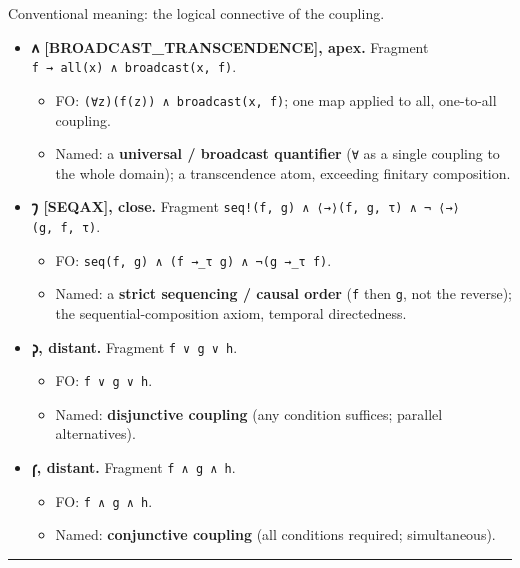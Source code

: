 Conventional meaning: the logical connective of the coupling.

\begin{itemize}
\tightlist
\item
  \textbf{𐑵 {[}BROADCAST\_TRANSCENDENCE{]}, apex.} Fragment
  \texttt{f\ →\ all(x)\ ∧\ broadcast(x,\ f)}.

  \begin{itemize}
  \tightlist
  \item
    FO: \texttt{(∀z)(f(z))\ ∧\ broadcast(x,\ f)}; one map applied to
    all, one-to-all coupling.
  \item
    Named: a \textbf{universal / broadcast quantifier} (\texttt{∀} as a
    single coupling to the whole domain); a transcendence atom,
    exceeding finitary composition.
  \end{itemize}
\item
  \textbf{𐑠 {[}SEQAX{]}, close.} Fragment
  \texttt{seq!(f,\ g)\ ∧\ ⟨→⟩(f,\ g,\ τ)\ ∧\ ¬\ ⟨→⟩(g,\ f,\ τ)}.

  \begin{itemize}
  \tightlist
  \item
    FO: \texttt{seq(f,\ g)\ ∧\ (f\ →\_τ\ g)\ ∧\ ¬(g\ →\_τ\ f)}.
  \item
    Named: a \textbf{strict sequencing / causal order} (\texttt{f} then
    \texttt{g}, not the reverse); the sequential-composition axiom,
    temporal directedness.
  \end{itemize}
\item
  \textbf{𐑜, distant.} Fragment \texttt{f\ ∨\ g\ ∨\ h}.

  \begin{itemize}
  \tightlist
  \item
    FO: \texttt{f\ ∨\ g\ ∨\ h}.
  \item
    Named: \textbf{disjunctive coupling} (any condition suffices;
    parallel alternatives).
  \end{itemize}
\item
  \textbf{𐑝, distant.} Fragment \texttt{f\ ∧\ g\ ∧\ h}.

  \begin{itemize}
  \tightlist
  \item
    FO: \texttt{f\ ∧\ g\ ∧\ h}.
  \item
    Named: \textbf{conjunctive coupling} (all conditions required;
    simultaneous).
  \end{itemize}
\end{itemize}

\begin{center}\rule{0.5\linewidth}{0.5pt}\end{center}

